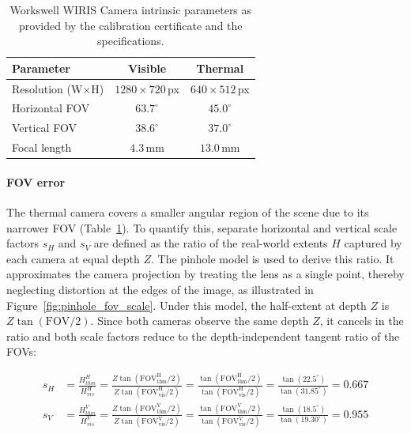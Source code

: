 \documentclass[12pt,oneside,bibtotoc,liststotoc]{scrbook}
\begin{document}
\begin{table}[h]
    \centering
    \scriptsize
    \begin{tabular}{|lcc|}
        \toprule
        \rowcolor{white}
        Parameter               & Visible             & Thermal            \\
        \midrule
        Resolution (W$\times$H) & $1280\times720$\,px & $640\times512$\,px \\
        Horizontal FOV          & $63.7^\circ$        & $45.0^\circ$       \\
        Vertical FOV            & $38.6^\circ$        & $37.0^\circ$       \\
        Focal length            & $4.3$\,mm           & $13.0$\,mm         \\
        \bottomrule
    \end{tabular}
    \caption{
        Workswell WIRIS Camera intrinsic parameters as provided by the calibration
        certificate and the specifications. \cite{worksellWIRISspec2022}
    }
    \label{tab:camera_params}
\end{table}

\paragraph{FOV error}

The thermal camera covers a smaller angular region of the scene
due to its narrower FOV (Table~\ref{tab:camera_params}).
To quantify this, separate horizontal and vertical scale factors
$s_H$ and $s_V$ are defined as the ratio of the real-world
extents $H$ captured by each camera at equal depth $Z$.
The pinhole model is used to derive this ratio. It approximates
the camera projection by treating the lens as a single point,
thereby neglecting distortion at the edges of the image, as
illustrated in Figure~\ref{fig:pinhole_fov_scale}. Under this
model, the half-extent at depth $Z$ is $Z\tan(\mathrm{FOV}/2)$.
Since both cameras observe the same depth $Z$, it cancels in
the ratio and both scale factors reduce to the depth-independent
tangent ratio of the FOVs:

\begin{align}
    s_H & = \frac{H_{thm}^H}
    {H_{vis}^H}
    = \frac{Z\tan(\mathrm{FOV_{thm}^H}/2)}
    {Z\tan(\mathrm{FOV_{vis}^H}/2)}
    = \frac{\tan(\mathrm{FOV_{thm}^H}/2)}
    {\tan(\mathrm{FOV_{vis}^H}/2)}
    = \frac{\tan(22.5^\circ)}{\tan(31.85^\circ)}
    = 0.667                  \\[6pt]
    s_V & = \frac{H_{thm}^V}
    {H_{vis}^V}
    = \frac{Z\tan(\mathrm{FOV_{thm}^V}/2)}
    {Z\tan(\mathrm{FOV_{vis}^V}/2)}
    = \frac{\tan(\mathrm{FOV_{thm}^V}/2)}
    {\tan(\mathrm{FOV_{vis}^V}/2)}
    = \frac{\tan(18.5^\circ)}{\tan(19.30^\circ)}
    = 0.955
\end{align}
\end{document}
